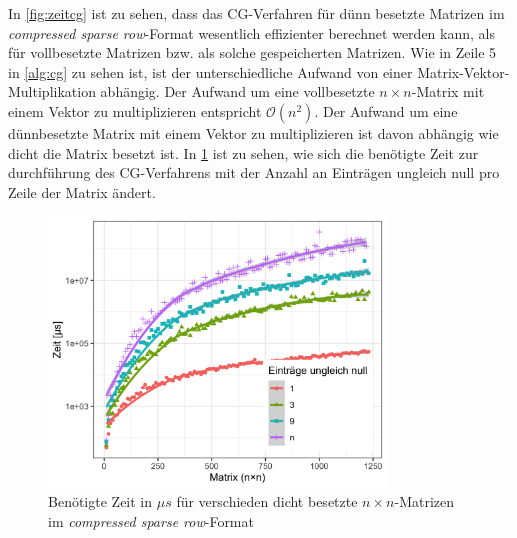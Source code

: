 \documentclass[12pt,a4paper]{scrartcl}
\numberwithin{equation}{section}
\numberwithin{myalgctr}{section}
\numberwithin{mytheoremctr}{subsection}
\numberwithin{mykorollarctr}{subsection}
\numberwithin{mylemmactr}{subsection}
\numberwithin{mybeispielctr}{subsection}
\begin{document}
	In \cref{fig:zeitcg} ist zu sehen, dass das CG-Verfahren f\"ur d\"unn besetzte Matrizen im \textit{compressed sparse row}-Format wesentlich effizienter berechnet werden kann, als f\"ur vollbesetzte Matrizen bzw. als solche gespeicherten Matrizen.
	Wie in Zeile 5 in \cref{alg:cg} zu sehen ist, ist der unterschiedliche Aufwand von einer Matrix-Vektor-Multiplikation abh\"angig. Der Aufwand um eine vollbesetzte $n\times n$-Matrix mit einem Vektor zu multiplizieren entspricht $\mathcal{O}(n^2)$. Der Aufwand um eine d\"unnbesetzte Matrix mit einem Vektor zu multiplizieren ist davon abh\"angig wie dicht die Matrix besetzt ist. In \cref{fig:zeitcg-sparse} ist zu sehen, wie sich die ben\"otigte Zeit zur durchf\"uhrung des CG-Verfahrens mit der Anzahl an Eintr\"agen ungleich null pro Zeile der Matrix \"andert.
	
	\begin{figure}[H]
		\begin{center}
			\includegraphics[width=0.8\textwidth]{../plots/cg-sparsity-sparse.png}
		\end{center}
		\caption{Ben\"otigte Zeit in $\mu s$ f\"ur verschieden dicht besetzte $n\times n$-Matrizen im \textit{compressed sparse row}-Format}
		\label{fig:zeitcg-sparse}	
	\end{figure}
	
\end{document}
